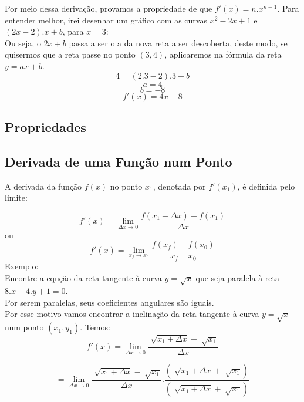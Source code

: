 \documentclass[ ]{article}
\begin{document}
	Por meio dessa derivação, provamos a propriedade de que $f'(x) = n.x^{n-1}$.
	\newpage
	Para entender melhor, irei desenhar um gráfico com as curvas $x^2-2x+1$ e $(2x-2).x+b$, para $x=3$:\\
	Ou seja, o $2x+b$ passa a ser o a da nova reta a ser descoberta, deste modo, se quisermos que a reta passe no ponto $(3,4)$, aplicaremos na fórmula da reta $y = ax+b$.
	$$4 = (2.3-2).3 + b$$
	$$a = 4$$ $$b=-8$$
	$$f'(x) = 4x - 8$$
	
	
	\subsection{Propriedades}
	
	\subsection{Derivada de uma Função num Ponto}
		A derivada da função $f(x)$ no ponto $x_1$, denotada por $f'(x_1)$, é definida pelo limite:
		
		$$f'(x) = \lim_{\Delta x\to 0} \dfrac{f(x_1+\Delta x)-f(x_1)}{\Delta x}$$
		ou
		$$f'(x) = \lim_{x_f\to x_0}\dfrac{f(x_f)-f(x_0)}{x_f-x_0}$$	
		Exemplo:\\
		Encontre a equção da reta tangente à curva $y = \sqrt{x}$ que seja paralela à reta $8.x - 4.y + 1 = 0$.\\
		Por serem paralelas, seus coeficientes angulares são iguais.\\
		Por esse motivo vamos encontrar a inclinação da reta tangente à curva $y = \sqrt{x}$ num ponto $(x_1,y_1)$. Temos:
		$$f'(x) = \lim_{\Delta x\to 0}\dfrac{\sqrt[]{x_1 + \Delta x}-\sqrt[ ]{x_1}}{\Delta x}$$

		$$= \lim_{\Delta x\to 0}\dfrac{\sqrt[]{x_1 + \Delta x}-\sqrt[ ]{x_1}}{\Delta x}.\dfrac{(\sqrt[ ]{x_1+\Delta x}+\sqrt[ ]{x_1})}{(\sqrt[ ]{x_1+\Delta x}+\sqrt[ ]{x_1})}$$
\end{document}

